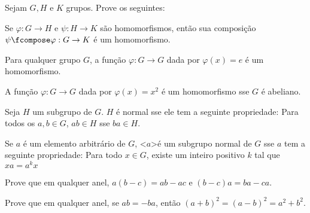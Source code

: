 Sejam $G, H$ e $K$ grupos. Prove os seguintes:

\begin{exercise}
	Se $\varphi: G \to H$ e $\psi: H \to K$ são homomorfismos, então sua composição $\psi \fcompose \varphi: G \to K$ é um homomorfismo.
\end{exercise}

\begin{exercise}
	Para qualquer grupo $G$, a função $\varphi: G \to G$ dada por $\varphi(x) = e$ é um homomorfismo.
\end{exercise}

\begin{exercise}
	A função $\varphi: G \to G$ dada por $\varphi(x) = x^2$ é um homomorfismo sse $G$ é abeliano.
\end{exercise}

\begin{exercise}
	Seja $H$ um subgrupo de $G$. $H$ é normal sse ele tem a seguinte propriedade:
	Para todos os $a, b \in G$, $ab \in H$ sse $ba \in H$.
\end{exercise}

\begin{exercise}
	Se $a$ é um elemento arbitrário de $G$, \textless $a$\textgreater é um subgrupo normal de $G$ sse $a$ tem a seguinte propriedade:
	Para todo $x \in G$, existe um inteiro positivo $k$ tal que $xa = a^k x$
\end{exercise}

\begin{exercise}
	Prove que em qualquer anel, $a(b - c) = ab - ac$ e $(b - c)a = ba -ca$.
\end{exercise}

\begin{exercise}
	Prove que em qualquer anel, se $ab = -ba$, então $(a + b)^2 = (a - b)^2 = a^2 + b^2$.
\end{exercise}
